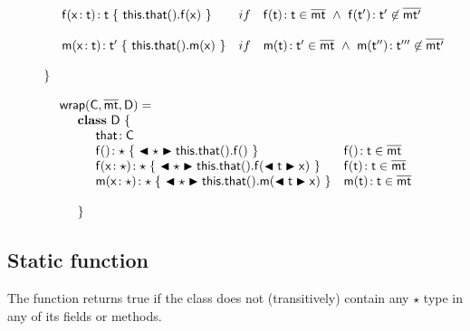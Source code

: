 \documentclass[acmlarge, anonymous, authordraft]{acmart}
\begin{document}
\[\begin{array}{@{}ll@{}l@{}r@{~}c@{~}r}
\\
\SPP \Mdef\f\x\t\t { ~\Set{\Get\this\that}\f\x~}
&    if\,\,\,\,\,\, \Mtype\f\t\t \in \bmt~\wedge~ \Mtype\f\tp\tp \not\in \bmtp \\
\\
\SPP \Mdef\m\x{\t}{\tp}{~\Set{\Get\this\that}\m{\x}~}
&    if\,\,\,\,\,\, \Mtype\m\t\tp\in\bmt ~\wedge~ \Mtype\m\tpp\tppp\not\in \bmtp \\
\\
\SP \}
\\
\end{array}\]

\[\begin{array}{@{}ll@{}l@{}r@{~}c@{~}r}
\wrapAny\C\bmt\D = \\
\SP \class~\D~\{\\
\SPP \Fdef \that \C\\ 
\SPP   \Mdefz\f\any{~\BehCast\any{\Get{{\Get\this\that}}\f}~}
&  \Mtype\f{}\t \in \bmt\\
\SPP   \Mdef\f\x\any\any{~\BehCast\any{\Set{\Get\this\that}\f{\bscast\t\x}}~}
&  \Mtype\f\t\t \in \bmt\\
\SPP   \Mdef\m\x\any\any {~\bscast\any{\Call{\Get\this\that}\m{\bscast{\t}\x} }~}
&  \Mtype\m\t\t\in\b\mt \\
\\
\SP \}\\
\end{array}\]


\subsection{Static function}

The  function returns true if the class \D does not (transitively) contain any $\star$ type
in any of its fields or methods.


\begin{mathpar}



\end{mathpar}
\\
\end{document}
